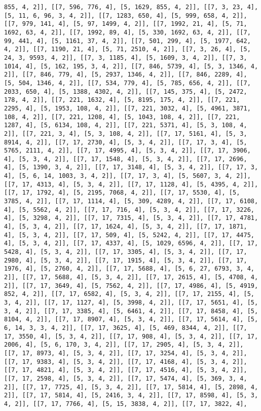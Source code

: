 \documentclass[12pt,fleqn]{article}\usepackage{../../common}
\begin{document}
\begin{verbatim}
855, 4, 2]], [[7, 596, 776, 4], [5, 1629, 855, 4, 2]], [[7, 3, 23, 4], [5, 11, 6, 96, 3, 4, 2]], [[7, 1283, 650, 4], [5, 999, 658, 4, 2]], [[7, 979, 141, 4], [5, 97, 1499, 4, 2]], [[7, 1992, 21, 4], [5, 71, 1692, 63, 4, 2]], [[7, 1992, 89, 4], [5, 330, 1692, 63, 4, 2]], [[7, 99, 441, 4], [5, 1161, 37, 4, 2]], [[7, 501, 299, 4], [5, 1977, 642, 4, 2]], [[7, 1190, 21, 4], [5, 71, 2510, 4, 2]], [[7, 3, 26, 4], [5, 24, 3, 9593, 4, 2]], [[7, 3, 1185, 4], [5, 1609, 3, 4, 2]], [[7, 3, 1014, 4], [5, 162, 195, 3, 4, 2]], [[7, 846, 5739, 4], [5, 3, 1346, 4, 2]], [[7, 846, 779, 4], [5, 2937, 1346, 4, 2]], [[7, 846, 2289, 4], [5, 504, 1346, 4, 2]], [[7, 534, 779, 4], [5, 785, 656, 4, 2]], [[7, 2033, 650, 4], [5, 1388, 4302, 4, 2]], [[7, 145, 375, 4], [5, 2472, 178, 4, 2]], [[7, 221, 1632, 4], [5, 8195, 175, 4, 2]], [[7, 221, 2295, 4], [5, 1953, 108, 4, 2]], [[7, 221, 3032, 4], [5, 4961, 3871, 108, 4, 2]], [[7, 221, 1208, 4], [5, 1043, 108, 4, 2]], [[7, 221, 1287, 4], [5, 6134, 108, 4, 2]], [[7, 221, 5371, 4], [5, 3, 108, 4, 2]], [[7, 221, 3, 4], [5, 3, 108, 4, 2]], [[7, 17, 5161, 4], [5, 3, 8914, 4, 2]], [[7, 17, 2730, 4], [5, 3, 4, 2]], [[7, 17, 3, 4], [5, 5765, 2111, 4, 2]], [[7, 17, 4995, 4], [5, 3, 4, 2]], [[7, 17, 3906, 4], [5, 3, 4, 2]], [[7, 17, 1548, 4], [5, 3, 4, 2]], [[7, 17, 2696, 4], [5, 1390, 3, 4, 2]], [[7, 17, 3148, 4], [5, 3, 4, 2]], [[7, 17, 3, 4], [5, 6, 14, 1003, 3, 4, 2]], [[7, 17, 3, 4], [5, 5607, 3, 4, 2]], [[7, 17, 4313, 4], [5, 3, 4, 2]], [[7, 17, 1128, 4], [5, 4395, 4, 2]], [[7, 17, 1792, 4], [5, 2195, 7068, 4, 2]], [[7, 17, 5530, 4], [5, 3785, 4, 2]], [[7, 17, 1114, 4], [5, 309, 4289, 4, 2]], [[7, 17, 6108, 4], [5, 5562, 4, 2]], [[7, 17, 716, 4], [5, 3, 4, 2]], [[7, 17, 3226, 4], [5, 3298, 4, 2]], [[7, 17, 7315, 4], [5, 3, 4, 2]], [[7, 17, 4781, 4], [5, 3, 4, 2]], [[7, 17, 1624, 4], [5, 3, 4, 2]], [[7, 17, 1871, 4], [5, 3, 4, 2]], [[7, 17, 509, 4], [5, 5242, 4, 2]], [[7, 17, 4475, 4], [5, 3, 4, 2]], [[7, 17, 4337, 4], [5, 1029, 6596, 4, 2]], [[7, 17, 5428, 4], [5, 3, 4, 2]], [[7, 17, 3305, 4], [5, 3, 4, 2]], [[7, 17, 2980, 4], [5, 3, 4, 2]], [[7, 17, 1915, 4], [5, 3, 4, 2]], [[7, 17, 1976, 4], [5, 2760, 4, 2]], [[7, 17, 5688, 4], [5, 6, 27, 6793, 3, 4, 2]], [[7, 17, 5688, 4], [5, 3, 4, 2]], [[7, 17, 2615, 4], [5, 4708, 4, 2]], [[7, 17, 3649, 4], [5, 7562, 4, 2]], [[7, 17, 4986, 4], [5, 4919, 852, 4, 2]], [[7, 17, 6582, 4], [5, 3, 4, 2]], [[7, 17, 2155, 4], [5, 3, 4, 2]], [[7, 17, 1127, 4], [5, 3998, 4, 2]], [[7, 17, 5651, 4], [5, 3, 4, 2]], [[7, 17, 3385, 4], [5, 6461, 4, 2]], [[7, 17, 8458, 4], [5, 8104, 4, 2]], [[7, 17, 8907, 4], [5, 3, 4, 2]], [[7, 17, 5614, 4], [5, 6, 14, 3, 3, 4, 2]], [[7, 17, 3625, 4], [5, 469, 8344, 4, 2]], [[7, 17, 3550, 4], [5, 3, 4, 2]], [[7, 17, 908, 4], [5, 3, 4, 2]], [[7, 17, 2006, 4], [5, 6, 170, 3, 4, 2]], [[7, 17, 2905, 4], [5, 3, 4, 2]], [[7, 17, 8973, 4], [5, 3, 4, 2]], [[7, 17, 3254, 4], [5, 3, 4, 2]], [[7, 17, 9383, 4], [5, 3, 4, 2]], [[7, 17, 4168, 4], [5, 3, 4, 2]], [[7, 17, 4821, 4], [5, 3, 4, 2]], [[7, 17, 4516, 4], [5, 3, 4, 2]], [[7, 17, 2598, 4], [5, 3, 4, 2]], [[7, 17, 5474, 4], [5, 369, 3, 4, 2]], [[7, 17, 7725, 4], [5, 3, 4, 2]], [[7, 17, 5814, 4], [5, 2898, 4, 2]], [[7, 17, 5814, 4], [5, 2416, 3, 4, 2]], [[7, 17, 8598, 4], [5, 3, 4, 2]], [[7, 17, 7766, 4], [5, 15, 3838, 4, 2]], [[7, 17, 3822, 4], 
\end{verbatim}
\end{document}
